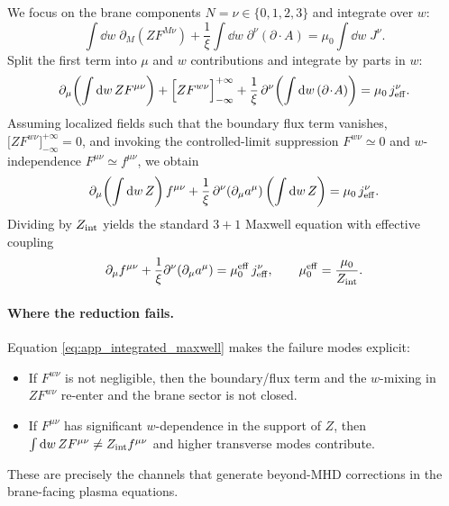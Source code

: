 \documentclass[11pt]{article}
\begin{document}
We focus on the brane components \(N=\nu\in\{0,1,2,3\}\) and integrate over \(w\):
\begin{equation}
\int \dd w\;\partial_M\!\left(ZF^{M\nu}\right)
+\frac{1}{\xi}\int \dd w\;\partial^\nu(\partial\!\cdot\!A)
=
\mu_0 \int \dd w\;J^\nu.
\label{eq:app_integrate_step1}
\end{equation}
Split the first term into \(\mu\) and \(w\) contributions and integrate by parts in \(w\):
\begin{equation}
\partial_\mu\!\left(\int \dd w\,Z F^{\mu\nu}\right)
+
\Big[Z F^{w\nu}\Big]_{-\infty}^{+\infty}
+
\frac{1}{\xi}\,\partial^\nu\!\left(\int \dd w\,(\partial\!\cdot\!A)\right)
=
\mu_0\,j_{\rm eff}^\nu.
\label{eq:app_integrated_maxwell}
\end{equation}
Assuming localized fields such that the boundary flux term vanishes,
\(\big[Z F^{w\nu}\big]_{-\infty}^{+\infty}=0\), and invoking the controlled-limit suppression
\(F^{w\nu}\simeq 0\) and \(w\)-independence \(F^{\mu\nu}\simeq f^{\mu\nu}\), we obtain
\begin{equation}
\partial_\mu\!\left(\int \dd w\,Z\right) f^{\mu\nu}
+\frac{1}{\xi}\,\partial^\nu(\partial_\mu a^\mu)\left(\int \dd w\,Z\right)
=
\mu_0\,j_{\rm eff}^\nu.
\label{eq:app_integrated_maxwell_zero_mode}
\end{equation}
Dividing by \(Z_{\rm int}\) yields the standard \(3+1\) Maxwell equation with effective coupling
\begin{equation}
\partial_\mu f^{\mu\nu} + \frac{1}{\xi}\partial^\nu(\partial_\mu a^\mu)
=
\mu_0^{\rm eff}\,j_{\rm eff}^\nu,
\qquad
\mu_0^{\rm eff}=\frac{\mu_0}{Z_{\rm int}}.
\label{eq:app_maxwell_eff_final}
\end{equation}

\paragraph{Where the reduction fails.}
Equation \eqref{eq:app_integrated_maxwell} makes the failure modes explicit:
\begin{itemize}[leftmargin=1.7em]
\item If \(F^{w\nu}\) is not negligible, then the boundary/flux term and the \(w\)-mixing in
\(ZF^{w\nu}\) re-enter and the brane sector is not closed.
\item If \(F^{\mu\nu}\) has significant \(w\)-dependence in the support of \(Z\), then
\(\int \dd w\,Z F^{\mu\nu}\neq Z_{\rm int} f^{\mu\nu}\) and higher transverse modes contribute.
\end{itemize}
These are precisely the channels that generate beyond-MHD corrections in the brane-facing plasma
equations.
\end{document}
